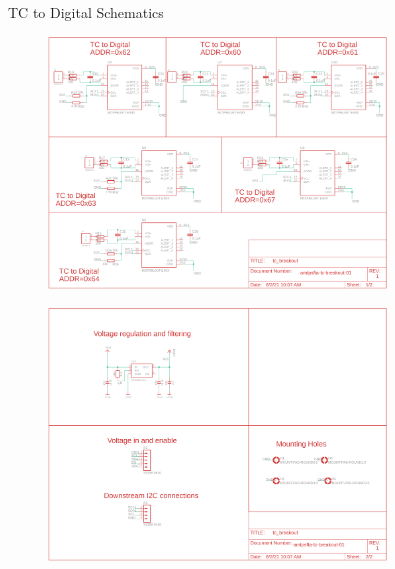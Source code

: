 \documentclass[UKenglish]{beamer}
\begin{document}
\begin{frame}[allowframebreaks]{TC to Digital Schematics}
\begin{figure}[H]
	\centering
	\includegraphics[width=0.8\textwidth]{images/tc-breakout-p1}
	\label{fig:schematic-tc-breakout-p1}
\end{figure}

\begin{figure}[H]
	\centering
	\includegraphics[width=0.8\textwidth]{images/tc-breakout-p2}
	\label{fig:schematic-tc-breakout-p2}
\end{figure}
\end{frame}
\end{document}
